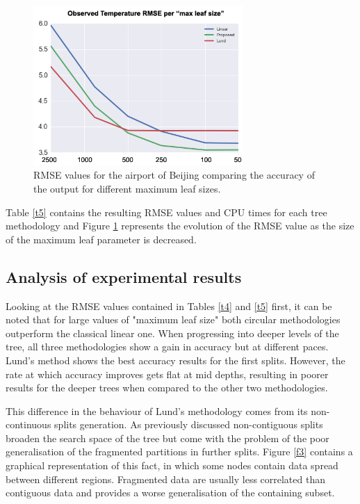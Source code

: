 \documentclass[times,twocolumn,final,authoryear]{elsarticle}
\begin{document}
\begin{figure}
  \includegraphics[width=8cm]{airports_fig.png}
\caption{RMSE values for the airport of Beijing comparing the accuracy of the output for different maximum leaf sizes.}
\label{f_tbn2}
\end{figure}

Table \ref{t5} contains the resulting RMSE values and CPU times for each tree methodology and Figure \ref{f_tbn2} represents the evolution of the RMSE value as the size of the maximum leaf parameter is decreased.

\subsection{Analysis of experimental results}

Looking at the RMSE values contained in Tables \ref{t4} and \ref{t5} first, it can be noted that for large values of "maximum leaf size" both circular methodologies outperform the classical linear one. When progressing into deeper levels of the tree, all three methodologies show a gain in accuracy but at different paces. Lund's method shows the best accuracy results for the first splits. However, the rate at which accuracy improves gets flat at mid depths, resulting in poorer results for the deeper trees when compared to the other two methodologies. 

This difference in the behaviour of Lund's methodology comes from its non-continuous splits generation. As previously discussed non-contiguous splits broaden the search space of the tree but come with the problem of the poor generalisation of the fragmented partitions in further splits. Figure \ref{f3} contains a graphical representation of this fact, in which some nodes contain data spread between different regions. Fragmented data are usually less correlated than contiguous data and provides a worse generalisation of the containing subset. 
\end{document}
